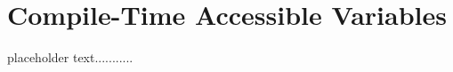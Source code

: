 \newpage
\section[{\tt constexpr} Variables]{Compile-Time Accessible Variables}\label{constexprvar}

placeholder text...........


